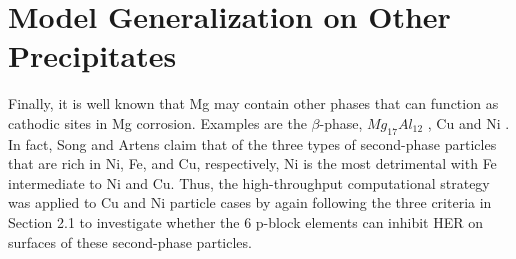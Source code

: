 \section{Model Generalization on Other Precipitates}

Finally, it is well known that Mg may contain other phases that can function as cathodic sites in Mg corrosion. Examples are the $\beta$-phase, $Mg_{17}Al_{12}$ \cite{guo2017influence}, Cu \cite{kawabata2012influence} and Ni \cite{hanawalt1942corrosion}. In fact, Song and Artens \cite{song2003understanding} claim that of the three types of second-phase particles that are rich in Ni, Fe, and Cu, respectively, Ni is the most detrimental with Fe intermediate to Ni and Cu. Thus, the high-throughput computational strategy was applied to Cu and Ni particle cases by again following the three criteria in Section 2.1 to investigate whether the 6 p-block elements can inhibit HER on surfaces of these second-phase particles. 

